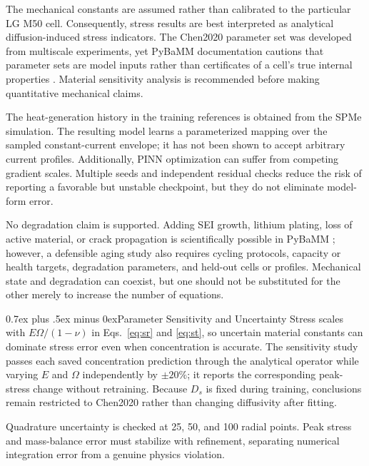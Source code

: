 \documentclass[conference]{IEEEtran}
\makeatletter
\newcommand{\headingfont}{\rmfamily}
\def\subsection{\@startsection{subsection}{2}{\z@}{1.5ex plus 1.5ex minus 0.5ex}%
{0.7ex plus .5ex minus 0ex}{\normalfont\headingfont\normalsize\bfseries}}
\makeatother
\begin{document}
The mechanical constants are assumed rather than calibrated to the particular LG M50 cell. Consequently, stress results are best interpreted as analytical diffusion-induced stress indicators. The Chen2020 parameter set was developed from multiscale experiments, yet PyBaMM documentation cautions that parameter sets are model inputs rather than certificates of a cell's true internal properties \cite{chen2020parameterization}. Material sensitivity analysis is recommended before making quantitative mechanical claims.

The heat-generation history in the training references is obtained from the SPMe simulation. The resulting model learns a parameterized mapping over the sampled constant-current envelope; it has not been shown to accept arbitrary current profiles. Additionally, PINN optimization can suffer from competing gradient scales. Multiple seeds and independent residual checks reduce the risk of reporting a favorable but unstable checkpoint, but they do not eliminate model-form error.

No degradation claim is supported. Adding SEI growth, lithium plating, loss of active material, or crack propagation is scientifically possible in PyBaMM \cite{sulzer2021pybamm}; however, a defensible aging study also requires cycling protocols, capacity or health targets, degradation parameters, and held-out cells or profiles. Mechanical state and degradation can coexist, but one should not be substituted for the other merely to increase the number of equations.

\subsection{Parameter Sensitivity and Uncertainty}
Stress scales with $E\Omega/(1-\nu)$ in Eqs.~\eqref{eq:sr} and \eqref{eq:st}, so uncertain material constants can dominate stress error even when concentration is accurate. The sensitivity study passes each saved concentration prediction through the analytical operator while varying $E$ and $\Omega$ independently by $\pm20\%$; it reports the corresponding peak-stress change without retraining. Because $D_s$ is fixed during training, conclusions remain restricted to Chen2020 rather than changing diffusivity after fitting.

Quadrature uncertainty is checked at 25, 50, and 100 radial points. Peak stress and mass-balance error must stabilize with refinement, separating numerical integration error from a genuine physics violation.
\end{document}
